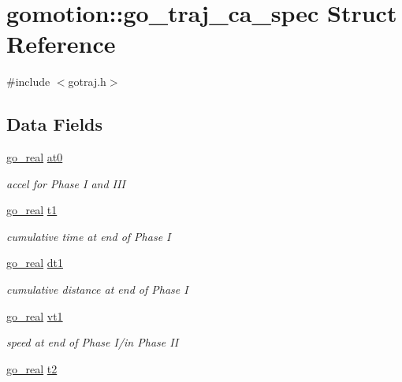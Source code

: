 \hypertarget{structgomotion_1_1go__traj__ca__spec}{\section{gomotion\-:\-:go\-\_\-traj\-\_\-ca\-\_\-spec Struct Reference}
\label{structgomotion_1_1go__traj__ca__spec}
}


{\ttfamily \#include $<$gotraj.\-h$>$}

\subsection*{Data Fields}
\begin{DoxyCompactItemize}
\item 
\hyperlink{gotypes_8h_afd666a2393eebd71ee455846ac9def9b}{go\-\_\-real} \hyperlink{structgomotion_1_1go__traj__ca__spec_a8f95c4b292ef47cd322a851145e0b3eb}{at0}
\begin{DoxyCompactList}\small\item\em accel for Phase I and I\-I\-I \end{DoxyCompactList}\item 
\hyperlink{gotypes_8h_afd666a2393eebd71ee455846ac9def9b}{go\-\_\-real} \hyperlink{structgomotion_1_1go__traj__ca__spec_a74e2a14901fa22a22255c7ed0d9df84b}{t1}
\begin{DoxyCompactList}\small\item\em cumulative time at end of Phase I \end{DoxyCompactList}\item 
\hyperlink{gotypes_8h_afd666a2393eebd71ee455846ac9def9b}{go\-\_\-real} \hyperlink{structgomotion_1_1go__traj__ca__spec_a7292672497463684db1160ad31042bf9}{dt1}
\begin{DoxyCompactList}\small\item\em cumulative distance at end of Phase I \end{DoxyCompactList}\item 
\hyperlink{gotypes_8h_afd666a2393eebd71ee455846ac9def9b}{go\-\_\-real} \hyperlink{structgomotion_1_1go__traj__ca__spec_ac455589252cf4d99759d09fb00a5eb35}{vt1}
\begin{DoxyCompactList}\small\item\em speed at end of Phase I/in Phase I\-I \end{DoxyCompactList}\item 
\hyperlink{gotypes_8h_afd666a2393eebd71ee455846ac9def9b}{go\-\_\-real} \hyperlink{structgomotion_1_1go__traj__ca__spec_ab45dbf63d9deeb63abddf7da84154bc1}{t2}

\end{DoxyCompactItemize}
